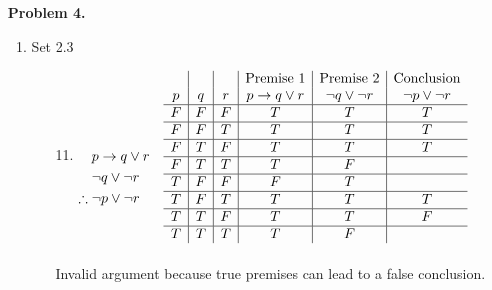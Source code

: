 \documentclass[letterpaper]{article}
\begin{document}
\begin{enumerate}
		\item [] \textbf{Problem 4.}
		\begin{enumerate}
			\item Set 2.3
			\begin{itemize}
				\item [11.]
				$\begin{aligned}[t]
					& p \rightarrow q \vee r & \\
					& \neg q \vee \neg r & \\
					\therefore{} & \neg p \vee \neg r &
				\end{aligned}\\
				\begin{array}{c|c|c|c|c|c}	
					& & & \text{Premise 1} & \text{Premise 2} & \text{Conclusion} \\
					p & q & r & p \rightarrow q \vee r & \neg q \vee \neg r & \neg p \vee \neg r \\ \hline
					F & F & F & T & T & T \\ \hline
					F & F & T & T & T & T \\ \hline
					F & T & F & T & T & T \\ \hline
					F & T & T & T & F &   \\ \hline
					T & F & F & F & T &   \\ \hline
					T & F & T & T & T & T \\ \hline
					T & T & F & T & T & F \\ \hline
					T & T & T & T & F &   \\ 
				\end{array}$ \\
				\\
				Invalid argument because true premises can lead to a false conclusion.
			\end{itemize}
		\end{enumerate}
		

\end{enumerate}
\end{document}
